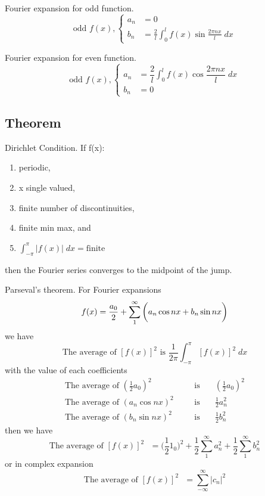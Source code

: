 \documentclass[../main.tex]{subfiles}
\begin{document}
Fourier expansion for odd function.
\begin{equation*}
    \text{odd }f(x),
    \begin{cases}
        a_n&=0\\
        b_n&=\displaystyle \frac{2}{l}\int_{0}^{l}  f(x)\sin \frac{2\pi nx}{l} \;dx
    \end{cases}
\end{equation*}

Fourier expansion for even function.
\begin{equation*}
    \text{odd }f(x),
    \begin{cases}
        a_n&=\dfrac{2}{l}  \displaystyle \int_{0}^{l}  f(x)\cos \dfrac{2\pi nx}{l} \;dx\\
        b_n&=0
    \end{cases}
\end{equation*}

\subsection*{Theorem}
Dirichlet Condition. If f(x):
\begin{enumerate}
    \item periodic,
    \item x single valued,
    \item finite number of discontinuities,
    \item finite min max, and
    \item $\int_{-\pi}^{\pi} |f(x)|\;dx=\text{finite}$
\end{enumerate}
then the Fourier series converges to the midpoint of the jump.

Parseval's theorem. For Fourier expansions
\begin{equation*}
    f(x)=\frac{a_0}{2}+\sum_{1}^{\infty}\bigg(a_n\cos nx +b_n\sin nx\bigg)\\
\end{equation*} 
we have
\begin{equation*}
    \text{The average of $[f(x)]^2$ is } \frac{1}{2\pi}\int_{-\pi}^{\pi} [f(x)]^2\; dx
\end{equation*}
with the value of each coefficients
\begin{align*}
    \text{The average of $(\frac{1}{2}a_0)^2$ }\quad&\text{is}\quad& (\frac{1}{2}a_0)^2\\
    \text{The average of $(a_n\cos nx)^2$ }\quad&\text{is}\quad& \frac{1}{2}a_n^2\\
    \text{The average of $(b_n\sin nx)^2$ }\quad&\text{is}\quad& \frac{1}{2}b_n^2
\end{align*}
then we have
\begin{equation*}
    \text{The average of $[f(x)]^2$ }=\bigg(\frac{1}{2}1_0\bigg)^2+\frac{1}{2}\sum_{1}^{\infty}a_n^2+\frac{1}{2}\sum_{1}^{\infty}b_n^2
\end{equation*}
or in complex expansion
\begin{equation*}
    \text{The average of $[f(x)]^2$ }=\sum_{-\infty}^{\infty}|c_n|^2
\end{equation*}
\end{document}
